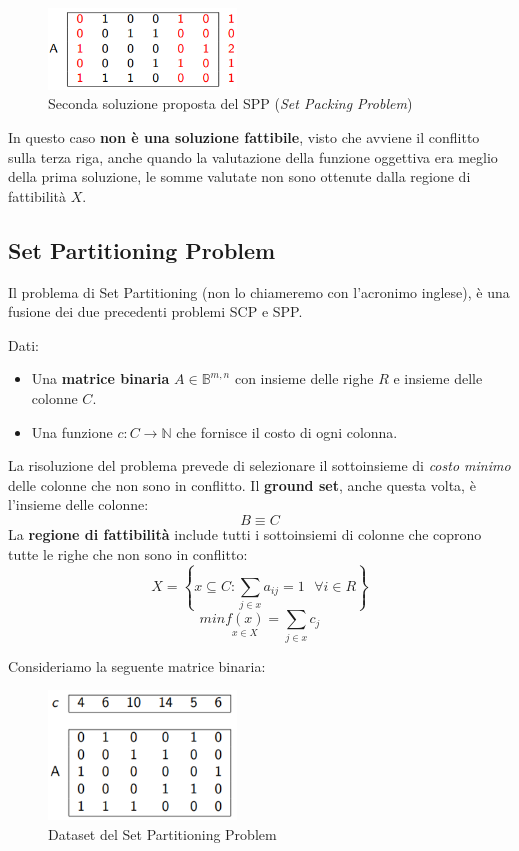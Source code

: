 \documentclass{article}
\begin{document}
\begin{figure}[H]
    \centering
    \includegraphics[width=5cm]{images/SPP_snd_sol.png}
    \caption{Seconda soluzione proposta del SPP (\textit{Set Packing Problem})}
    \label{fig:snd_sol_SPP}
\end{figure}
In questo caso \textbf{non è una soluzione fattibile}, visto che avviene il conflitto sulla terza riga, anche quando
la valutazione della funzione oggettiva era meglio della prima soluzione, le somme valutate non sono ottenute dalla
regione di fattibilità $X$.

\subsection{Set Partitioning Problem}
Il problema di Set Partitioning (non lo chiameremo con l'acronimo inglese), è una fusione dei due precedenti problemi
SCP e SPP.

Dati:
\begin{itemize}
    \item Una \textbf{matrice binaria} $A\in \mathbb{B}^{m,n}$ con insieme delle righe $R$ e insieme delle colonne
          $C$.
    \item Una funzione $c:C\rightarrow\mathbb{N}$ che fornisce il costo di ogni colonna.
\end{itemize}
La risoluzione del problema prevede di selezionare il sottoinsieme di \textit{costo minimo} delle colonne
che non sono in conflitto.
Il \textbf{ground set}, anche questa volta, è l'insieme delle colonne:
$$B\equiv C$$
La \textbf{regione di fattibilità} include tutti i sottoinsiemi di colonne che coprono tutte le righe che non
sono in conflitto:
$$X=\left\{x\subseteq C:\sum_{j\in x}a_{ij}=1 \text{ }\forall i \in R\right\}$$
$$min\underset{x\in X}{f(x)}=\sum_{j\in x}c_j$$

Consideriamo la seguente matrice binaria:

\begin{figure}[H]
    \centering
    \includegraphics[width=5cm]{images/SPP2_dataset.png}
    \caption{Dataset del Set Partitioning Problem}
    \label{fig:dataset_SPP2}
\end{figure}
\end{document}
